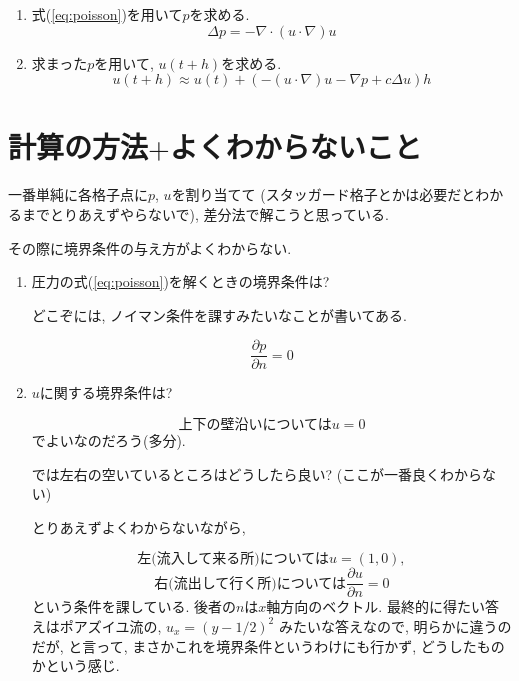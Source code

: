 \documentclass[12pt,dvipdfmx]{article}
\begin{document}
\begin{enumerate}
\item 式(\ref{eq:poisson})を用いて$p$を求める.
  \begin{equation}
    \Delta p = - \nabla \cdot (u \cdot \nabla) u
    \label{eq:poisson}
  \end{equation}
\item 求まった$p$を用いて, $u(t+h)$を求める.
  \begin{equation}
    u(t + h) \approx u(t) + (- (u \cdot \nabla) u - \nabla p + c \Delta u) h
    \label{eq:step}
  \end{equation}
\end{enumerate}

\section{計算の方法$+$よくわからないこと}
一番単純に各格子点に$p$, $u$を割り当てて
(スタッガード格子とかは必要だとわかるまでとりあえずやらないで),
差分法で解こうと思っている.

その際に境界条件の与え方がよくわからない.

\begin{enumerate}
\item 圧力の式(\ref{eq:poisson})を解くときの境界条件は?

  どこぞには, ノイマン条件を課すみたいなことが書いてある.

  \begin{equation}
  \frac{\partial p}{\partial n} = 0 \label{eq:boundary_p}
  \end{equation}
  
\item $u$に関する境界条件は?

  \begin{equation}
    \mbox{上下の壁沿いについては}u = 0 \label{eq:eq:boundary_top_bottom}
  \end{equation}
  でよいなのだろう(多分).

  では左右の空いているところはどうしたら良い? (ここが一番良くわからない)

  とりあえずよくわからないながら,

  \begin{equation}
    \mbox{左(流入して来る所)については} u = (1, 0), \label{eq:boundary_left}
  \end{equation}
  \begin{equation}
    \mbox{右(流出して行く所)については}
    \frac{\partial u}{\partial n} = 0 \label{eq:boundary_right}
  \end{equation}
  という条件を課している. 後者の$n$は$x$軸方向のベクトル.
  最終的に得たい答えはポアズイユ流の,
  $u_x = (y - 1/2)^2$ みたいな答えなので, 明らかに違うのだが,
  と言って, まさかこれを境界条件というわけにも行かず,
  どうしたものかという感じ.
\end{enumerate}
\end{document}
